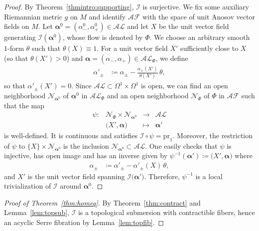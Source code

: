 \documentclass[letterpaper, 11pt]{article}
\numberwithin{equation}{section}
\begin{document}
\begin{proof} By Theorem~\ref{thmintro:supporting}, $\mathcal{I}$ is surjective. We fix some auxiliary Riemannian metric $g$ on $M$ and identify $\mathcal{AF}$ with the space of unit Anosov vector fields on $M$. Let $\boldsymbol{\alpha}^0 = (\alpha^0_-, \alpha^0_+) \in \mathcal{AL}$ and let $X$ be the unit vector field generating $\mathcal{I}(\boldsymbol{\alpha}^0)$, whose flow is denoted by $\Phi$. We choose an arbitrary smooth $1$-form $\theta$ such that $\theta(X) \equiv 1$. For a unit vector field $X'$ sufficiently close to $X$ (so that $\theta(X') > 0$) and $\boldsymbol{\alpha} = (\alpha_-, \alpha_+) \in \mathcal{AL}_\Phi$, we define
\begin{align*}
\alpha'_\pm &\coloneqq \alpha_\pm - \frac{\alpha_\pm(X')}{\theta(X')} \, \theta,
\end{align*}
so that $\alpha'_\pm(X') = 0$. Since $\mathcal{AL} \subset \Omega^1 \times \Omega^1$ is open, we can find an open neighborhood $\mathcal{N}_{\boldsymbol{\alpha}^0}$ of $\boldsymbol{\alpha}^0$ in $\mathcal{AL}_\Phi$ and an open neighborhood $\mathcal{N}_\Phi$ of $\Phi$ in $\mathcal{AF}$ such that the map
$$\begin{array}{rccc}
\psi : &  \mathcal{N}_\Phi \times \mathcal{N}_{\boldsymbol{\alpha}^0} & \longrightarrow & \mathcal{AL} \\
	& \big(X',\boldsymbol{\alpha} \big) & \longmapsto & \boldsymbol{\alpha}'
\end{array}$$
is well-defined. It is continuous and satisfies $\mathcal{I} \circ \psi = \mathrm{pr}_1$. Moreover, the restriction of $\psi$ to $\{X\} \times \mathcal{N}_{\boldsymbol{\alpha}^0}$ is the inclusion $\mathcal{N}_{\boldsymbol{\alpha}^0} \subset \mathcal{AL}$. One easily checks that $\psi$ is injective, has open image and has an inverse given by $\psi^{-1}(\boldsymbol{\alpha}') \coloneqq \big(X', \boldsymbol{\alpha} \big)$ where
\begin{align*}
\alpha_\pm &\coloneqq \alpha'_\pm - \alpha'_\pm(X) \, \theta,
\end{align*}
and $X'$ is the unit vector field spanning $\mathcal{I}\big( \boldsymbol{\alpha}'\big)$. Therefore, $\psi^{-1}$ is a local trivialization of $\mathcal{I}$ around $\boldsymbol{\alpha}^0$.
\end{proof}

\begin{proof}[Proof of Theorem~\ref{thm:homeq}]
By Theorem~\ref{thm:contract} and Lemma~\ref{lem:topsub}, $\mathcal{I}$ is a topological submersion with contractible fibers, hence an acyclic Serre fibration by Lemma~\ref{lem:topfib}.
\end{proof}
\end{document}
